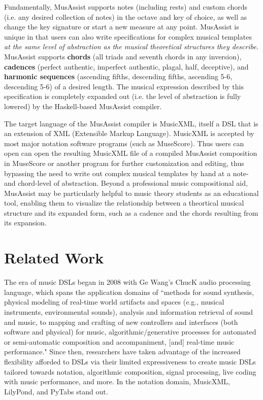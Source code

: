 \documentclass{article}
\begin{document}
Fundamentally, MusAssist supports notes (including rests) and custom chords (i.e. any desired collection of notes)
in the octave and key of choice, as well as change the key signature or start a new measure at any
point. MusAssist is unique in that users can also write specifications for complex musical templates \textit{at the same level of abstraction
as the musical theoretical structures they describe}. MusAssist supports \textbf{chords} (all triads and seventh chords in any inversion), \textbf{cadences}
(perfect authentic, imperfect authentic, plagal, half, deceptive), and \textbf{harmonic sequences} (ascending
fifths, descending fifths, ascending 5-6, descending 5-6) of a desired length. The musical expression 
described by this specification is completely expanded out (i.e. the level of abstraction is
fully lowered) by the Haskell-based MusAssist compiler.

The target language of the MusAssist compiler is MusicXML, itself a DSL that is an extension of
XML (Extensible Markup Language). MusicXML is accepted by most major notation software programs (such as MuseScore). 
Thus users can open can open the resulting MusicXML file of a compiled MusAssist composition in MuseScore or another
program for further customization and editing, thus bypassing the need to write out complex musical templates by hand at a 
note- and chord-level of abstraction. Beyond a professional music compositional aid, MusAssist may be particularly 
helpful to music theory students as an educational tool, enabling them to visualize the relationship between a theortical musical structure 
and its expanded form, such as a cadence and the chords resulting from its expansion.


\section{Related Work}\label{sec:related_work}

The era of music DSLs began in 2008 with Ge Wang's ChucK audio processing language, which  
spans the application domains of ``methods for sound synthesis, physical modeling of real-time world artifacts and spaces (e.g., 
musical instruments, environmental sounds), analysis and information retrieval of sound and music, to 
mapping and crafting of new controllers and interfaces (both software and physical) for music, 
algorithmic/generative processes for automated or semi-automatic composition and accompaniment, [and] 
real-time music performance." %
Since then, researchers have taken advantage of the increased flexibility afforded to DSLs via their limited expressiveness to create
music DSLs tailored towards notation, algorithmic composition, signal processing, live coding with music performance, and more. In the 
 notation domain, MusicXML, LilyPond, and PyTabs stand out.
\end{document}
